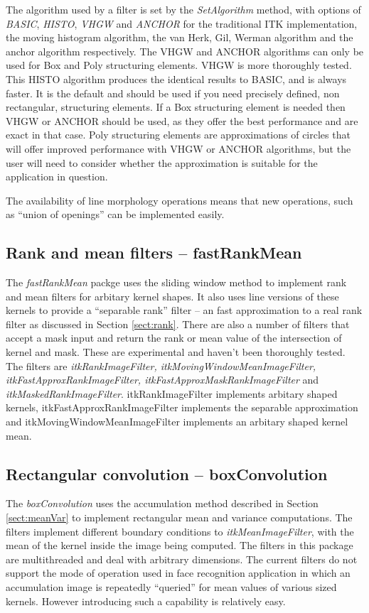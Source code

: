 \documentclass{InsightArticle}
\begin{document}
The algorithm used by a filter is set by the {\em SetAlgorithm}
method, with options of {\em BASIC}, {\em HISTO}, {\em VHGW} and {\em
ANCHOR} for the traditional ITK implementation, the moving histogram
algorithm, the van Herk, Gil, Werman algorithm and the anchor
algorithm respectively. The VHGW and ANCHOR algorithms can only be
used for Box and Poly structuring elements. VHGW is more thoroughly
tested. This HISTO algorithm produces the identical results to BASIC,
and is always faster. It is the default and should be used if you need
precisely defined, non rectangular, structuring elements. If a Box
structuring element is needed then VHGW or ANCHOR should be used, as
they offer the best performance and are exact in that case. Poly
structuring elements are approximations of circles that will offer
improved performance with VHGW or ANCHOR algorithms, but the user will
need to consider whether the approximation is suitable for the
application in question.

The availability of line morphology operations means that new
operations, such as ``union of openings'' can be implemented easily.

\subsection{Rank and mean filters -- fastRankMean}
The {\em fastRankMean} packge uses the sliding window method to
implement rank and mean filters for arbitary kernel shapes. It also
uses line versions of these kernels to provide a ``separable rank''
filter -- an fast approximation to a real rank filter as discussed in
Section \ref{sect:rank}. There are also a number of filters that
accept a mask input and return the rank or mean value of the
intersection of kernel and mask. These are experimental and haven't
been thoroughly tested. The filters are {\em itkRankImageFilter,
itkMovingWindowMeanImageFilter, itkFastApproxRankImageFilter,
itkFastApproxMaskRankImageFilter} and {\em
itkMaskedRankImageFilter}. itkRankImageFilter implements arbitary
shaped kernels, itkFastApproxRankImageFilter implements the separable
approximation and itkMovingWindowMeanImageFilter implements an
arbitary shaped kernel mean.

\subsection{Rectangular convolution -- boxConvolution}
The {\em boxConvolution} uses the accumulation method described in
Section \ref{sect:meanVar} to implement rectangular mean and variance
computations. The filters implement different boundary conditions to
{\em itkMeanImageFilter}, with the mean of the kernel inside the image
being computed. The filters in this package are multithreaded and deal
with arbitrary dimensions. The current filters do not support the mode
of operation used in face recognition application in which an
accumulation image is repeatedly ``queried'' for mean values of
various sized kernels. However introducing such a capability is
relatively easy.
\end{document}
